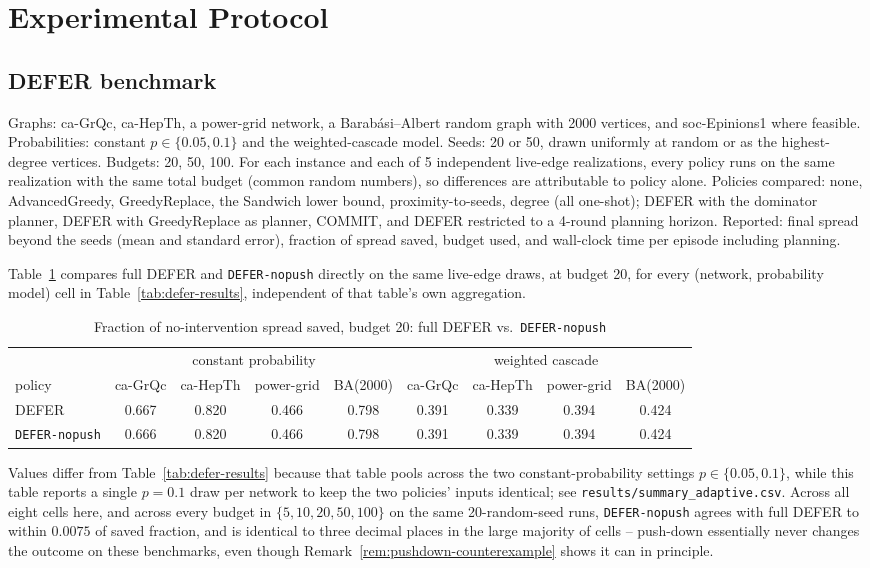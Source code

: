 \documentclass[ASNA,number]{USG}
\newcommand{\up}{\rule{0pt}{2.6ex}}
\newcommand{\down}{\rule[-1.2ex]{0pt}{0pt}}
\begin{document}
\section{Experimental Protocol}\label{ec:reproducibility}

\subsection{DEFER benchmark}
Graphs: ca-GrQc, ca-HepTh, a power-grid network, a Barab\'asi--Albert
random graph with 2000 vertices, and soc-Epinions1 where feasible.
Probabilities: constant $p\in\{0.05,0.1\}$ and the weighted-cascade model.
Seeds: 20 or 50, drawn uniformly at random or as the highest-degree
vertices. Budgets: 20, 50, 100. For each instance and each of 5 independent
live-edge realizations, every policy runs on the same realization with the
same total budget (common random numbers), so differences are attributable
to policy alone. Policies compared: none, AdvancedGreedy, GreedyReplace,
the Sandwich lower bound, proximity-to-seeds, degree (all one-shot); DEFER
with the dominator planner, DEFER with GreedyReplace as planner, COMMIT,
and DEFER restricted to a 4-round planning horizon. Reported: final spread
beyond the seeds (mean and standard error), fraction of spread saved,
budget used, and wall-clock time per episode including planning.

Table~\ref{tab:defer-nopush-parity} compares full DEFER and
\texttt{DEFER-nopush} directly on the same live-edge draws, at budget 20,
for every (network, probability model) cell in
Table~\ref{tab:defer-results}, independent of that table's own
aggregation.

\begin{table}[h]
\centering
\caption{Fraction of no-intervention spread saved, budget 20: full DEFER vs.\ \texttt{DEFER-nopush}\label{tab:defer-nopush-parity}}
\begin{tabular}{@{}lcccccccc@{}}
\hline
\up & \multicolumn{4}{c}{constant probability} & \multicolumn{4}{c}{weighted cascade} \\
policy & ca-GrQc & ca-HepTh & power-grid & BA(2000) & ca-GrQc & ca-HepTh & power-grid & BA(2000) \\
\hline
\up DEFER & 0.667 & 0.820 & 0.466 & 0.798 & 0.391 & 0.339 & 0.394 & 0.424 \\
\down \texttt{DEFER-nopush} & 0.666 & 0.820 & 0.466 & 0.798 & 0.391 & 0.339 & 0.394 & 0.424 \\
\hline
\end{tabular}
Values differ from Table~\ref{tab:defer-results} because that table
pools across the two constant-probability settings $p\in\{0.05,0.1\}$,
while this table reports a single $p=0.1$ draw per network to keep the
two policies' inputs identical; see
\texttt{results/summary\_adaptive.csv}. Across all eight cells here, and
across every budget in $\{5,10,20,50,100\}$ on the same
20-random-seed runs, \texttt{DEFER-nopush} agrees with full DEFER to
within $0.0075$ of saved fraction, and is identical to three decimal
places in the large majority of cells -- push-down essentially never
changes the outcome on these benchmarks, even though
Remark~\ref{rem:pushdown-counterexample} shows it can in principle.
\end{table}
\end{document}
